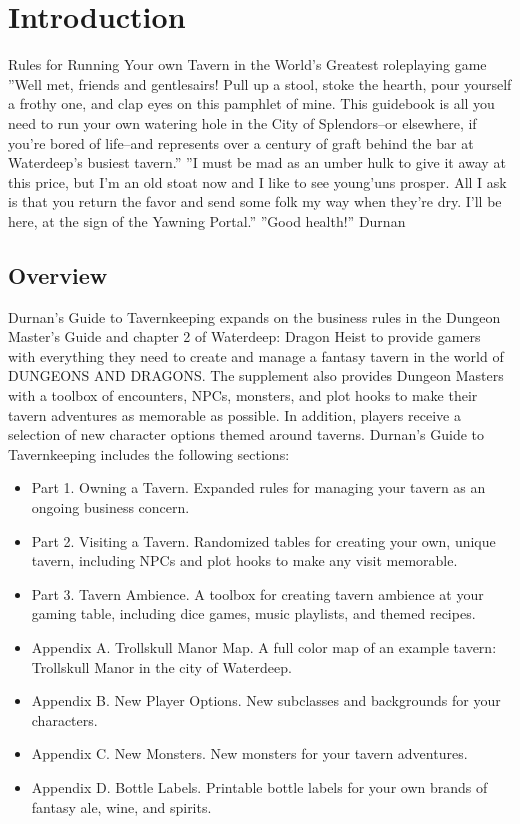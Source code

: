 \documentclass[10pt,a4paper,twoside,twocolumn,openany,bg=print,nodeprecatedcode]{dndbook}
\begin{document}
\tableofcontents
\newpage
\chapter{Introduction}
Rules for Running Your own Tavern in the World's Greatest roleplaying game
\DndQuote%
{}
{''Well met, friends and gentlesairs! Pull up a stool, stoke the hearth, pour yourself a frothy one, and clap eyes on this pamphlet of mine. This guidebook is all you need to run your own watering hole in the City of Splendors–or elsewhere, if you're bored of life–and represents over a century of graft behind the bar at Waterdeep's busiest tavern.''}
{''I must be mad as an umber hulk to give it away at this price, but I'm an old stoat now and I like to see young'uns prosper. All I ask is that you return the favor and send some folk my way when they're dry. I'll be here, at the sign of the Yawning Portal.''}
{''Good health!''}
{Durnan}
\section{Overview}
Durnan's Guide to Tavernkeeping expands on the business rules in the Dungeon Master's Guide and chapter 2 of Waterdeep: Dragon Heist to provide gamers with everything they need to create and manage a fantasy tavern in the world of DUNGEONS AND DRAGONS.
The supplement also provides Dungeon Masters with a toolbox of encounters, NPCs, monsters, and plot hooks to make their tavern adventures as memorable as possible. In addition, players receive a selection of new character options themed around taverns.
Durnan's Guide to Tavernkeeping includes the following sections:

\begin{itemize}
\item Part 1. Owning a Tavern. Expanded rules for managing your tavern as an ongoing business concern.
\item Part 2. Visiting a Tavern. Randomized tables for creating your own, unique tavern, including NPCs and plot hooks to make any visit memorable.
\item Part 3. Tavern Ambience. A toolbox for creating tavern ambience at your gaming table, including dice games, music playlists, and themed recipes.
\item Appendix A. Trollskull Manor Map. A full color map of an example tavern: Trollskull Manor in the city of Waterdeep.
\item Appendix B. New Player Options. New subclasses and backgrounds for your characters.
\item Appendix C. New Monsters. New monsters for your tavern adventures.
\item Appendix D. Bottle Labels. Printable bottle labels for your own brands of fantasy ale, wine, and spirits.
\end{itemize}
\end{document}
